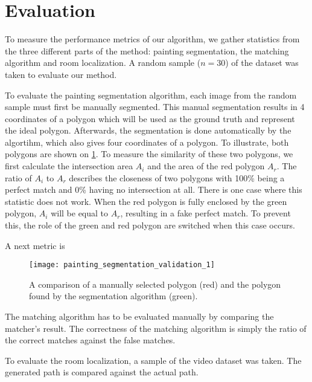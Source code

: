 \section{Evaluation}
	To measure the performance metrics of our algorithm, we gather statistics from the three different parts of the method: painting segmentation, the matching algorithm and room localization. A random sample ($n = 30$) of the dataset was taken to evaluate our method.
	
	To evaluate the painting segmentation algorithm, each image from the random sample must first be manually segmented. This manual segmentation results in 4 coordinates of a polygon which will be used as the ground truth and represent the ideal polygon. Afterwards, the segmentation is done automatically by the algortihm, which also gives four coordinates of a polygon. To illustrate, both polygons are shown on \ref{fig:painting_segmentation_validation_1}.
	To measure the similarity of these two polygons, we first calculate the intersection area $A_i$ and the area of the red polygon $A_r$. The ratio of $A_i$ to $A_r$ describes the closeness of two polygons with 100\% being a perfect match and 0\% having no intersection at all. There is one case where this statistic does not work. When the red polygon is fully enclosed by the green polygon, $A_i$ will be equal to $A_r$, resulting in a fake perfect match. To prevent this, the role of the green and red polygon are switched when this case occurs. 
	
	A next metric is 
	

	
	\begin{figure}
		\centering
		\texttt{[image: painting\_segmentation\_validation\_1]}
		\caption{A comparison of a manually selected polygon (red) and the polygon found by the segmentation algorithm (green).}
		\label{fig:painting_segmentation_validation_1}
	\end{figure}


	
	The matching algorithm has to be evaluated manually by comparing the matcher's result. The correctness of the matching algorithm is simply the ratio of the correct matches against the false matches.
	
	To evaluate the room localization, a sample of the video dataset was taken. The generated path is compared against the actual path.
